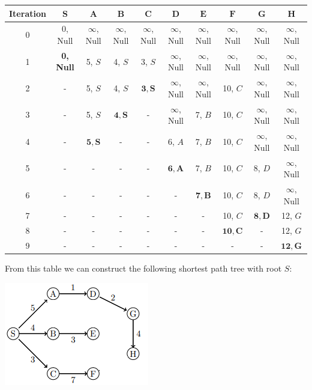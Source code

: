 \documentclass{article}
\begin{document}
\hspace*{-0.4in}
\begin{tabular}{c|c|c|c|c|c|c|c|c|c}
  \textbf{Iteration} & $\bm{S}$ & $\bm{A}$ & $\bm{B}$ & $\bm{C}$ & $\bm{D}$ & $\bm{E}$ & $\bm{F}$ & $\bm{G}$ & $\bm{H}$\\\hline
  0 & 0, Null & $\infty$, Null & $\infty$, Null & $\infty$, Null & $\infty$, Null & $\infty$, Null & $\infty$, Null & $\infty$, Null & $\infty$, Null\\\hline
  1 & \textbf{0, Null} & 5, $S$ & 4, $S$ & 3, $S$ & $\infty$, Null & $\infty$, Null & $\infty$, Null & $\infty$, Null & $\infty$, Null\\\hline
  2 & - & 5, $S$ & 4, $S$ & $\bm{3, S}$ & $\infty$, Null & $\infty$, Null & 10, $C$ & $\infty$, Null & $\infty$, Null\\\hline
  3 & - & 5, $S$ & $\bm{4, S}$ & - & $\infty$, Null & 7, $B$ & 10, $C$ & $\infty$, Null & $\infty$, Null\\\hline
  4 & - & $\bm{5, S}$ & - & - & 6, $A$ & 7, $B$ & 10, $C$ & $\infty$, Null & $\infty$, Null\\\hline
  5 & - & - & - & - & $\bm{6, A}$ & 7, $B$ & 10, $C$ & 8, $D$ & $\infty$, Null\\\hline
  6 & - & - & - & - & - & $\bm{7, B}$ & 10, $C$ & 8, $D$ & $\infty$, Null\\\hline
  7 & - & - & - & - & - & - & 10, $C$ & $\bm{8, D}$ & 12, $G$\\\hline
  8 & - & - & - & - & - & - & $\bm{10, C}$ & - & 12, $G$\\\hline
  9 & - & - & - & - & - & - & - & - & $\bm{12, G}$
\end{tabular}
\bigskip

From this table we can construct the following shortest path tree with root $S$:
\begin{center}
  \includegraphics{graph4cSPT.png}
\end{center}
\newpage
\end{document}
